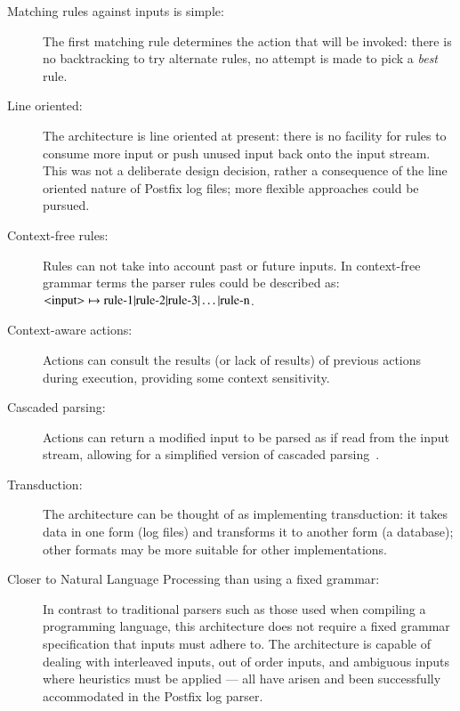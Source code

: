\documentclass[preprint,draft,numbers]{elsarticle}
\begin{document}
\begin{description}

    \item [Matching rules against inputs is simple:]  The first matching
        rule determines the action that will be invoked: there is no
        backtracking to try alternate rules, no attempt is made to pick a
        \textit{best\/} rule.

    \item [Line oriented:]  The architecture is line oriented at present:
        there is no facility for rules to consume more input or push unused
        input back onto the input stream.  This was not a deliberate design
        decision, rather a consequence of the line oriented nature of
        Postfix log files; more flexible approaches could be pursued.

    \item [Context-free rules:]  Rules can not take into account past or
        future inputs.  In context-free grammar terms the parser rules
        could be described as:
        \newline{}$\text{\textless{}input\textgreater{}} \mapsto
        \text{rule-1} | \text{rule-2} | \text{rule-3} | \dots |
        \text{rule-n}$.

    \item [Context-aware actions:] Actions can consult the results (or lack
        of results) of previous actions during execution, providing some
        context sensitivity.  
        
    \item [Cascaded parsing:] Actions can return a modified input to be
        parsed as if read from the input stream, allowing for a simplified
        version of cascaded parsing~\cite{cascaded-parsing}.

    \item [Transduction:]  The architecture can be thought of as
        implementing transduction: it takes data in one form (log files)
        and transforms it to another form (a database); other formats may
        be more suitable for other implementations.

    \item [Closer to Natural Language Processing than using a fixed
        grammar:] \hfill{}In contrast \newline{} to traditional parsers
        such as those used when compiling a programming language, this
        architecture does not require a fixed grammar specification that
        inputs must adhere to.  The architecture is capable of dealing with
        interleaved inputs, out of order inputs, and ambiguous inputs where
        heuristics must be applied --- all have arisen and been
        successfully accommodated in the Postfix log parser.

\end{description}
\end{document}
